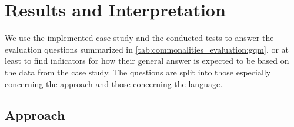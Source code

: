 


\section{Results and Interpretation}

We use the implemented case study and the conducted tests to answer the evaluation questions summarized in \autoref{tab:commonalities_evaluation:gqm}, or at least to find indicators for how their general answer is expected to be based on the data from the case study.
The questions are split into those especially concerning the \commonalities approach and those concerning the \commonalities language.

\subsection*{\Commonalities Approach}

